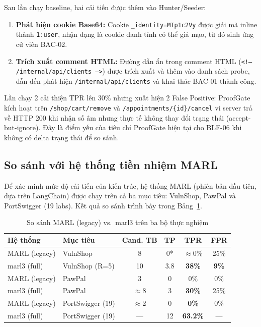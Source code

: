 Sau lần chạy baseline, hai cải tiến được thêm vào Hunter/Seeder:

\begin{enumerate}
    \item \textbf{Phát hiện cookie Base64:} Cookie \texttt{\_identity=MTp1c2Vy} được giải mã inline thành \texttt{1:user}, nhận dạng là cookie danh tính có thể giả mạo, từ đó sinh ứng cử viên BAC-02.
    \item \textbf{Trích xuất comment HTML:} Đường dẫn ẩn trong comment HTML (\texttt{<!-- /internal/api/clients -->}) được trích xuất và thêm vào danh sách probe, dẫn đến phát hiện \texttt{/internal/api/clients} và khai thác BAC-01 thành công.
\end{enumerate}

Lần chạy 2 cải thiện TPR lên 30\% nhưng xuất hiện 2 False Positive: ProofGate kích hoạt trên \texttt{/shop/cart/remove} và \texttt{/appointments/\{id\}/cancel} vì server trả về HTTP 200 khi nhận số âm nhưng thực tế không thay đổi trạng thái (accept-but-ignore). Đây là điểm yếu của tiêu chí ProofGate hiện tại cho BLF-06 khi không có delta trạng thái để so sánh.

\subsection{So sánh với hệ thống tiền nhiệm MARL}
\label{sec:marl_vs_marl3}

Để xác minh mức độ cải tiến của kiến trúc, hệ thống MARL (phiên bản đầu tiên, dựa trên LangChain) được chạy trên cả ba mục tiêu: VulnShop, PawPal và PortSwigger (19 labs). Kết quả so sánh trình bày trong Bảng~\ref{tab:marl_compare}.

\begin{table}[h]
\centering
\renewcommand{\arraystretch}{1.3}
\caption{So sánh MARL (legacy) vs.\ marl3 trên ba bộ thực nghiệm}
\label{tab:marl_compare}
\begin{tabular}{|l|l|c|c|c|c|}
\hline
\textbf{Hệ thống} & \textbf{Mục tiêu} & \textbf{Cand. TB} & \textbf{TP} & \textbf{TPR} & \textbf{FPR} \\
\hline
MARL (legacy) & VulnShop & 8 & 0* & $\approx$0\% & 25\% \\
\hline
marl3 (full) & VulnShop (R=5) & 10 & 3.8 & \textbf{38\%} & \textbf{9\%} \\
\hline
MARL (legacy) & PawPal & 3 & 0 & 0\% & 0\% \\
\hline
marl3 (full) & PawPal & $\approx$8 & 3 & \textbf{30\%} & 25\% \\
\hline
MARL (legacy) & PortSwigger (19) & $\approx$2 & 0 & \textbf{0\%} & 0\% \\
\hline
marl3 (full) & PortSwigger (19) & — & 12 & \textbf{63.2\%} & — \\
\hline
\end{tabular}
\end{table}

